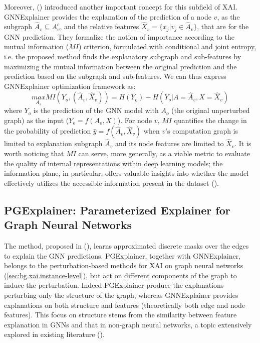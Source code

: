 \documentclass[binding=0.6cm]{sapthesis}
\newcommand{\mycite}[1]{(\cite{#1})}
\begin{document}
Moreover, \mycite{ying2019-gnnexplainer} introduced another important concept for this subfield of XAI. GNNExplainer provides the explanation of the prediction of a node $v$, as the subgraph $\hat{A}_v \subseteq A_v^c$, and the relative features $\hat{X}_v = \{x_j|v_j \in \hat{A}_v\}$, that are  for the GNN prediction. They formalize the notion of importance according to the mutual information ($MI$) criterion, formulated with conditional and joint entropy, i.e. the proposed method finds the explanatory subgraph and sub-features by maximizing the mutual information between the original prediction and the prediction based on the subgraph and sub-features. We can thus express GNNExplainer optimization framework as:
\begin{equation}
    \underset{A_s}{max} MI(Y_o,(\hat{A}_v,\hat{X}_v)) = H(Y_o) - H(Y_o| A = \hat{A}_v, X = \hat{X}_v)
    \label{eq:cfpg.bg.mutual-info-gnn}
\end{equation}
where $Y_o$ is the prediction of the GNN model with $A_o$ (the original unperturbed graph) as the input ($Y_o = f(A_o,X)$). For node $v$, $MI$ quantifies the change in the probability of prediction $\hat{y} = f(\hat{A}_v,\hat{X}_v)$ when $v$’s computation graph is limited to explanation subgraph $\hat{A}_v$ and its node features are limited to $\hat{X}_v$. It is worth noticing that $MI$ can serve, more generally, as a viable metric to evaluate the quality of internal representations within deep learning models; the information plane, in particular, offers valuable insights into whether the model effectively utilizes the accessible information present in the dataset \mycite{landsverk2022-mutual-info}.


\subsection{PGExplainer: Parameterized Explainer for Graph Neural Networks}
\label{sec:cfpg.bg.pgexplainer}
The method, proposed in \mycite{luo2020-pgexplainer}, learns approximated discrete masks over the edges to explain the GNN predictions. PGExplainer, together with GNNExplainer, belongs to the perturbation-based methods for XAI on graph neural networks (\cref{sec:bg.xai.instance-level}), but act on different components of the graph to induce the perturbation. Indeed PGExplainer produce the explanations perturbing only the structure of the graph, whereas GNNExplainer provides explanations on both structure and features (theoretically both edge and node features). This focus on structure stems from the similarity between feature explanation in GNNs and that in non-graph neural networks, a topic extensively explored in existing literature \mycite{guo2018-bayesian-non,lundberg2017-AUA,ribeiro2016-lime}.
\end{document}
